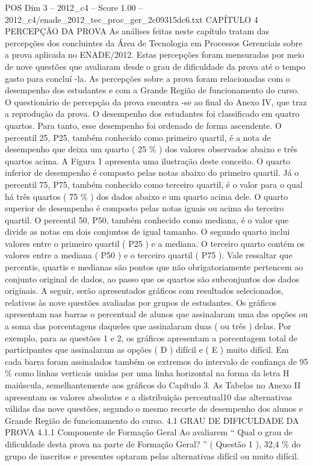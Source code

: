 \begin{textsample}{POS Dim 3 – 2012\_c4 – Score 1.00 – 2012\_c4/enade\_2012\_tec\_proc\_ger\_2c09315dc6.txt}  \label{ex:f3_pos_160}
CAPÍTULO 4 PERCEPÇÃO DA PROVA As análises feitas neste capítulo tratam das percepções dos concluintes da Área de Tecnologia em Processos Gerenciais sobre a prova aplicada no ENADE/2012.
Estas percepções foram mensuradas por meio de nove questões que avaliaram desde o grau de dificuldade da prova até o tempo gasto para concluí -la.
As percepções sobre a prova foram relacionadas com o desempenho dos estudantes e com a Grande Região de funcionamento do curso.
O questionário de percepção da prova encontra -se ao final do Anexo IV, que traz a reprodução da prova.
O desempenho dos estudantes foi classificado em quatro quartos.
Para tanto, esse desempenho foi ordenado de forma ascendente.
O percentil 25, P25, também conhecido como primeiro quartil, é a nota de desempenho que deixa um quarto ( 25 \% ) dos valores observados abaixo e três quartos acima.
A Figura 1 apresenta uma ilustração deste conceito.
O quarto inferior de desempenho é composto pelas notas abaixo do primeiro quartil.
Já o percentil 75, P75, também conhecido como terceiro quartil, é o valor para o qual há três quartos ( 75 \% ) dos dados abaixo e um quarto acima dele.
O quarto superior de desempenho é composto pelas notas iguais ou acima do terceiro quartil.
O percentil 50, P50, também conhecido como mediana, é o valor que divide as notas em dois conjuntos de igual tamanho.
O segundo quarto inclui valores entre o primeiro quartil ( P25 ) e a mediana.
O terceiro quarto contém os valores entre a mediana ( P50 ) e o terceiro quartil ( P75 ).
Vale ressaltar que percentis, quartis e medianas são pontos que não obrigatoriamente pertencem ao conjunto original de dados, ao passo que os quartos são subconjuntos dos dados originais.
A seguir, serão apresentados gráficos com resultados selecionados, relativos às nove questões avaliadas por grupos de estudantes.
Os gráficos apresentam nas barras o percentual de alunos que assinalaram uma das opções ou a soma das porcentagens daqueles que assinalaram duas ( ou três ) delas.
Por exemplo, para as questões 1 e 2, os gráficos apresentam a porcentagem total de participantes que assinalaram as opções ( D ) difícil e ( E ) muito difícil.
Em cada barra foram assinalados também os extremos do intervalo de confiança de 95 \% como linhas verticais unidas por uma linha horizontal na forma da letra H maiúscula, semelhantemente aos gráficos do Capítulo 3.
As Tabelas no Anexo II apresentam os valores absolutos e a distribuição percentual10 das alternativas válidas das nove questões, segundo o mesmo recorte de desempenho dos alunos e Grande Região de funcionamento do curso. 4.1 GRAU DE DIFICULDADE DA PROVA 4.1.1 Componente de Formação Geral Ao avaliarem “ Qual o grau de dificuldade desta prova na parte de Formação Geral? ” ( Questão 1 ), 32,4 \% do grupo de inscritos e presentes optaram pelas alternativas difícil ou muito difícil.

\end{textsample}
